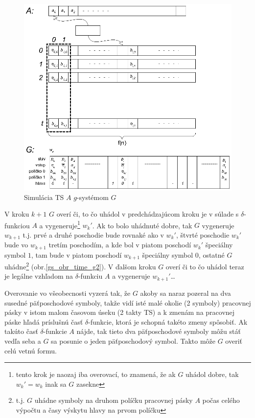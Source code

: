\begin{dokaz}
\begin{figure}[!ht]
  \centering
  \includegraphics{img/gsystems/time_g}
  \caption{Simulácia TS $A$ $g$-systémom $G$} \label{gs_obr_time_g}
\end{figure}

V kroku $k+1$ $G$ overí či, to čo uhádol v predchádzajúcom kroku
je v súlade s $\delta$-funkciou $A$ a vygeneruje\footnote{tento
krok je naozaj iba overovací, to znamená, že ak $G$ uhádol dobre,
tak $w_k'=w_k$ inak sa $G$ zasekne} $w_k'$. Ak to bolo uhádnuté
dobre, tak $G$ vygeneruje $w_{k+1}$ t.j. prvé a druhé poschodie
bude rovnaké ako v $w_k'$, štvrté poschodie $w_k'$ bude vo
$w_{k+1}$ tretím poschodím, a kde bol v piatom poschodí $w_k'$
špeciálny symbol $1$, tam bude v piatom poschodí $w_{k+1}$
špeciálny symbol $0$, ostatné $G$ uhádne\footnote{t.j. $G$ uhádne
symboly na druhom políčku pracovnej pásky $A$ počas celého výpočtu
a časy výskytu hlavy na prvom políčku} (obr.\ref{gs_obr_time_g2}). V
ďalšom kroku $G$ overí či to čo uhádol teraz je legálne vzhľadom
na $\delta$-funkciu $A$ a vygeneruje $w_{k+1}'$\dots

Overovanie vo všeobecnosti vyzerá tak, že $G$ akoby sa naraz
pozeral na dva susedné päťposchodové symboly, takže vidí isté malé
okolie (2 symboly) pracovnej pásky v istom malom časovom úseku (2
takty TS) a k zmenám na pracovnej páske hľadá príslušnú časť
$\delta$-funkcie, ktorá je schopná takéto zmeny spôsobiť. Ak
takúto časť $\delta$-funkcie $A$ nájde, tak tieto dva
päťposchodové symboly môžu stáť vedľa seba a $G$ sa posunie o
jeden päťposchodový symbol. Takto môže $G$ overiť celú vetnú
formu.


\end{dokaz}
